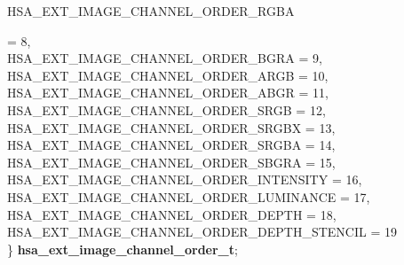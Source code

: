 \documentclass[final,oneside]{book}
\newcommand{\reftyp}[1]{#1}
\newcommand{\refenu}[1]{\reftyp{#1}}
\newenvironment{mylongtable}{\rowcolors{0}{lightgray}{lightgray}\longtable} {
\endlongtable}
\begin{document}
\begin{mylongtable}{@{}p{\textwidth}}
\hspace{1.7em}\hypertarget{group__ext-images_1ggabaced4fb1f3b9fdaa978e143af5ff055a0c5e8dc0eef9af781786ef67ee3702df}{\refenu{HSA_\-EXT_\-IMAGE_\-CHANNEL_\-ORDER_\-RGBA}} = 8,\\
\hspace{1.7em}\hypertarget{group__ext-images_1ggabaced4fb1f3b9fdaa978e143af5ff055a8f8724381ae9dfe592a15808ebe8c1d2}{\refenu{HSA_\-EXT_\-IMAGE_\-CHANNEL_\-ORDER_\-BGRA}} = 9,\\
\hspace{1.7em}\hypertarget{group__ext-images_1ggabaced4fb1f3b9fdaa978e143af5ff055a7a49085ae07e467293c0a10d003a2356}{\refenu{HSA_\-EXT_\-IMAGE_\-CHANNEL_\-ORDER_\-ARGB}} = 10,\\
\hspace{1.7em}\hypertarget{group__ext-images_1ggabaced4fb1f3b9fdaa978e143af5ff055a8fd833428ebe3e1428e0001115ec6880}{\refenu{HSA_\-EXT_\-IMAGE_\-CHANNEL_\-ORDER_\-ABGR}} = 11,\\
\hspace{1.7em}\hypertarget{group__ext-images_1ggabaced4fb1f3b9fdaa978e143af5ff055a64dbb297ed7cf48f525ffe32aa653319}{\refenu{HSA_\-EXT_\-IMAGE_\-CHANNEL_\-ORDER_\-SRGB}} = 12,\\
\hspace{1.7em}\hypertarget{group__ext-images_1ggabaced4fb1f3b9fdaa978e143af5ff055a38d8f1c70900f6646df6a6d20746f840}{\refenu{HSA_\-EXT_\-IMAGE_\-CHANNEL_\-ORDER_\-SRGBX}} = 13,\\
\hspace{1.7em}\hypertarget{group__ext-images_1ggabaced4fb1f3b9fdaa978e143af5ff055ae9980a3013f42e7d56f4fd28ea8c3b7c}{\refenu{HSA_\-EXT_\-IMAGE_\-CHANNEL_\-ORDER_\-SRGBA}} = 14,\\
\hspace{1.7em}\hypertarget{group__ext-images_1ggabaced4fb1f3b9fdaa978e143af5ff055a2617e3d26bbf6dd3c136534dcf5e4594}{\refenu{HSA_\-EXT_\-IMAGE_\-CHANNEL_\-ORDER_\-SBGRA}} = 15,\\
\hspace{1.7em}\hypertarget{group__ext-images_1ggabaced4fb1f3b9fdaa978e143af5ff055a5fb131f53f229f55456287a009da9b6e}{\refenu{HSA_\-EXT_\-IMAGE_\-CHANNEL_\-ORDER_\-INTENSITY}} = 16,\\
\hspace{1.7em}\hypertarget{group__ext-images_1ggabaced4fb1f3b9fdaa978e143af5ff055a5576d6ae7fd07c21fa8196c4323f1476}{\refenu{HSA_\-EXT_\-IMAGE_\-CHANNEL_\-ORDER_\-LUMINANCE}} = 17,\\
\hspace{1.7em}\hypertarget{group__ext-images_1ggabaced4fb1f3b9fdaa978e143af5ff055ad26aef84eb00f1d1e9defc45f7508e50}{\refenu{HSA_\-EXT_\-IMAGE_\-CHANNEL_\-ORDER_\-DEPTH}} = 18,\\
\hspace{1.7em}\hypertarget{group__ext-images_1ggabaced4fb1f3b9fdaa978e143af5ff055aa1c158a53efa2619ceefa748f3d99a99}{\refenu{HSA_\-EXT_\-IMAGE_\-CHANNEL_\-ORDER_\-DEPTH_\-STENCIL}} = 19\\
\} \hypertarget{group__ext-images_1gabaced4fb1f3b9fdaa978e143af5ff055}{\textbf{hsa_\-ext_\-image_\-channel_\-order_\-t}};\rule[-2ex]{0pt}{0pt}\end{mylongtable}
\end{document}
